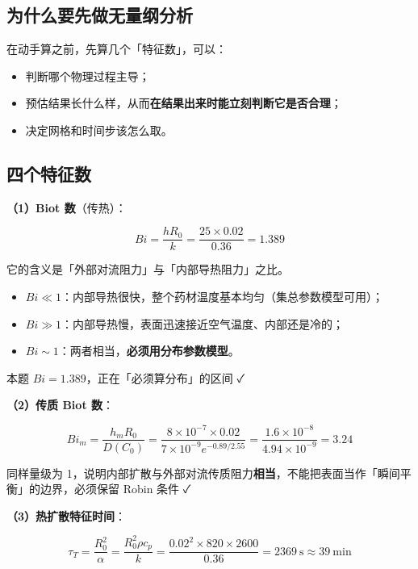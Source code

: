 \subsection{为什么要先做无量纲分析}


在动手算之前，先算几个「特征数」，可以：


\begin{itemize}
\item 判断哪个物理过程主导；
\item 预估结果长什么样，从而\textbf{在结果出来时能立刻判断它是否合理}；
\item 决定网格和时间步该怎么取。
\end{itemize}


\subsection{四个特征数}


\textbf{（1）Biot 数}（传热）：


\begin{equation*}
Bi=\frac{hR_0}{k}=\frac{25\times0.02}{0.36}=1.389
\end{equation*}


它的含义是「外部对流阻力」与「内部导热阻力」之比。


\begin{itemize}
\item $Bi\ll1$：内部导热很快，整个药材温度基本均匀（集总参数模型可用）；
\item $Bi\gg1$：内部导热慢，表面迅速接近空气温度、内部还是冷的；
\item $Bi\sim1$：两者相当，\textbf{必须用分布参数模型}。
\end{itemize}


本题 $Bi=1.389$，正在「必须算分布」的区间 ✓


\textbf{（2）传质 Biot 数}：


\begin{equation*}
Bi_m=\frac{h_mR_0}{D(C_0)}=\frac{8\times10^{-7}\times0.02}{7\times10^{-9}e^{-0.89/2.55}}=\frac{1.6\times10^{-8}}{4.94\times10^{-9}}=3.24
\end{equation*}


同样量级为 1，说明内部扩散与外部对流传质阻力\textbf{相当}，不能把表面当作「瞬间平衡」的边界，必须保留 Robin 条件 ✓


\textbf{（3）热扩散特征时间}：


\begin{equation*}
\tau_T=\frac{R_0^2}{\alpha}=\frac{R_0^2\rho c_p}{k}=\frac{0.02^2\times820\times2600}{0.36}=2369\ \mathrm s\approx39\ \mathrm{min}
\end{equation*}


